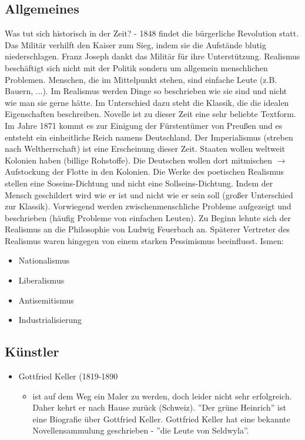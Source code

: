 \documentclass[12pt,a4paper]{article}
\begin{document}
\subsection{Allgemeines}
Was tut sich historisch in der Zeit? - 1848 findet die bürgerliche Revolution statt. Das Militär verhilft den Kaiser zum Sieg, indem sie die Aufstände blutig niederschlagen. Franz Joseph dankt das Militär für ihre Unterstützung.
\newline
\newline
Realismus beschäftigt sich nicht mit der Politik sondern um allgemein menschlichen Problemen. Menschen, die im Mittelpunkt stehen, sind einfache Leute (z.B. Bauern, ...). Im Realismus werden Dinge so beschrieben wie sie sind und nicht wie man sie gerne hätte. Im Unterschied dazu steht die Klassik, die die idealen Eigenschaften beschreiben. Novelle ist zu dieser Zeit eine sehr beliebte Textform.
\newline
\newline
Im Jahre 1871 kommt es zur Einigung der Fürstentümer von Preußen und es entsteht ein einheitliche Reich namens Deutschland. Der Imperialismus (streben nach Weltherrschaft) ist eine Erscheinung dieser Zeit. Staaten wollen weltweit Kolonien haben (billige Rohstoffe). Die Deutschen wollen dort mitmischen $\rightarrow$ Aufstockung der Flotte in den Kolonien.
\newline
\newline
Die Werke des poetischen Realismus stellen eine Soseins-Dichtung und nicht eine Sollseins-Dichtung. Indem der Mensch geschildert wird wie er ist und nicht wie er sein soll (großer Unterschied zur Klassik). Vorwiegend werden zwischenmenschliche Probleme aufgezeigt und beschrieben (häufig Probleme von einfachen Leuten).
\newline
\newline
Zu Beginn lehnte sich der Realismus an die Philosophie von Ludwig Feuerbach an. Späterer Vertreter des Realismus waren hingegen von einem starken Pessimismus beeinflusst.
\newline
\newline
Ismen:
\begin{itemize}
\item Nationalismus
\item Liberalismus
\item Antisemitismus
\item Industrialisierung 
\end{itemize}

\subsection{Künstler}
\begin{itemize}
\item Gottfried Keller (1819-1890
	\begin{itemize}
	\item ist auf dem Weg ein Maler zu werden, doch leider nicht sehr erfolgreich. Daher kehrt er  nach Hause zurück (Schweiz). ''Der grüne Heinrich'' ist eine Biografie über Gottfried Keller. Gottfried Keller hat eine bekannte Novellensammulung geschrieben - ''die Leute von Seldwyla''.
	\end{itemize}
\end{itemize}
\end{document}
